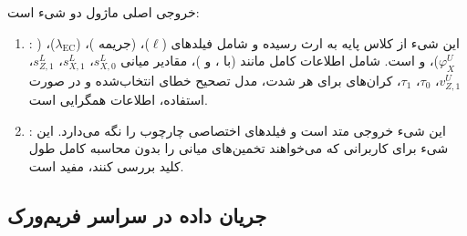 خروجی اصلی ماژول دو شیء است:

\begin{enumerate}
	\item {}: این شیء از کلاس پایه به ارث رسیده و شامل فیلدهای  ($\ell$)،  (جریمه )،  ($\lambda_{\text{EC}}$)،  ($\varphi_X^U$)،  و  است.  شامل اطلاعات کامل مانند  (با ،  و )، مقادیر میانی $s_{X,0}^L$، $s_{X,1}^L$، $s_{Z,1}^L$، $v_{Z,1}^U$، $\tau_0$، $\tau_1$، کران‌های  برای هر شدت، مدل تصحیح خطای انتخاب‌شده و در صورت استفاده، اطلاعات همگرایی  است.
	\item {}: این شیء خروجی متد  است و فیلدهای اختصاصی چارچوب  را نگه می‌دارد. این شیء برای کاربرانی که می‌خواهند تخمین‌های میانی را بدون محاسبه کامل طول کلید بررسی کنند، مفید است.
\end{enumerate}

\subsection{جریان داده در سراسر فریم‌ورک}

